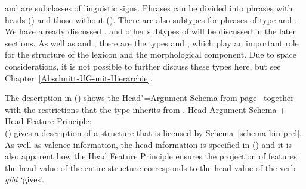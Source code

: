 \noindent
{} and  are subclasses of linguistic signs. Phrases can be divided into phrases with heads ()
and those without (). There are also subtypes for phrases of type  and .
We have already discussed , and other subtypes of  will be discussed in the later sections.
As well as  and , there are the types  and , which play an important role for the structure of the
lexicon and the morphological component. Due to space considerations, it is not possible to further discuss these types here,
but see Chapter~\ref{Abschnitt-UG-mit-Hierarchie}.

The description in () shows the Head"=Argument Schema from page~\pageref{schema-bin-prel} together with the restrictions that the type
 inherits from .
\eas
\label{head-arg-schema-hfp}
Head-Argument Schema + Head Feature Principle:\\
\zs
() gives a description of a structure that is licensed by Schema~\ref{schema-bin-prel}.
As well as valence information, the head information is specified in () and it is also apparent how the Head Feature Principle
ensures the projection of features: the head value of the entire structure  corresponds to
the head value of the verb \emph{gibt} `gives'.
\ea
